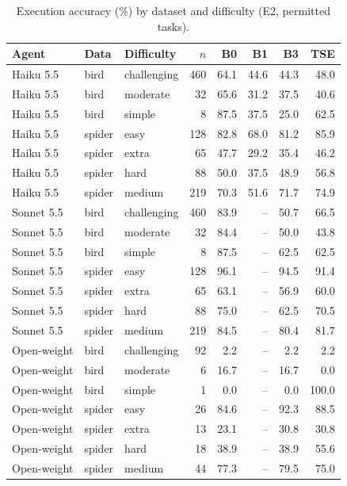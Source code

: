 \begin{table}[h]\centering\caption{Execution accuracy (\%) by dataset and difficulty (E2, permitted tasks).}\label{tab:difficulty}
\scriptsize\begin{tabular}{lllrrrrr}\hline\textbf{Agent} & \textbf{Data} & \textbf{Difficulty} & $n$ & B0 & B1 & B3 & TSE \\\hline
Haiku 5.5 & bird & challenging & 460 & 64.1 & 44.6 & 44.3 & 48.0 \\
Haiku 5.5 & bird & moderate & 32 & 65.6 & 31.2 & 37.5 & 40.6 \\
Haiku 5.5 & bird & simple & 8 & 87.5 & 37.5 & 25.0 & 62.5 \\
Haiku 5.5 & spider & easy & 128 & 82.8 & 68.0 & 81.2 & 85.9 \\
Haiku 5.5 & spider & extra & 65 & 47.7 & 29.2 & 35.4 & 46.2 \\
Haiku 5.5 & spider & hard & 88 & 50.0 & 37.5 & 48.9 & 56.8 \\
Haiku 5.5 & spider & medium & 219 & 70.3 & 51.6 & 71.7 & 74.9 \\
Sonnet 5.5 & bird & challenging & 460 & 83.9 & -- & 50.7 & 66.5 \\
Sonnet 5.5 & bird & moderate & 32 & 84.4 & -- & 50.0 & 43.8 \\
Sonnet 5.5 & bird & simple & 8 & 87.5 & -- & 62.5 & 62.5 \\
Sonnet 5.5 & spider & easy & 128 & 96.1 & -- & 94.5 & 91.4 \\
Sonnet 5.5 & spider & extra & 65 & 63.1 & -- & 56.9 & 60.0 \\
Sonnet 5.5 & spider & hard & 88 & 75.0 & -- & 62.5 & 70.5 \\
Sonnet 5.5 & spider & medium & 219 & 84.5 & -- & 80.4 & 81.7 \\
Open-weight & bird & challenging & 92 & 2.2 & -- & 2.2 & 2.2 \\
Open-weight & bird & moderate & 6 & 16.7 & -- & 16.7 & 0.0 \\
Open-weight & bird & simple & 1 & 0.0 & -- & 0.0 & 100.0 \\
Open-weight & spider & easy & 26 & 84.6 & -- & 92.3 & 88.5 \\
Open-weight & spider & extra & 13 & 23.1 & -- & 30.8 & 30.8 \\
Open-weight & spider & hard & 18 & 38.9 & -- & 38.9 & 55.6 \\
Open-weight & spider & medium & 44 & 77.3 & -- & 79.5 & 75.0 \\
\hline\end{tabular}\end{table}
